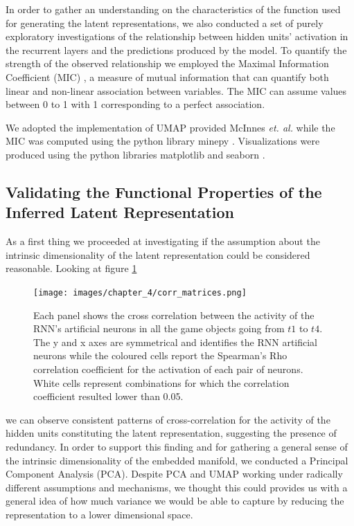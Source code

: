In order to gather an understanding on the characteristics of the function used for generating the latent representations, we also conducted a set of purely exploratory investigations of the relationship between hidden units' activation in the recurrent layers and the predictions produced by the model. To quantify the strength of the observed relationship we employed the Maximal Information Coefficient (MIC) \cite{reshef2011detecting}, a measure of mutual information that can quantify both linear and non-linear association between variables. The MIC can assume values between 0 to 1 with 1 corresponding to a perfect association. 

We adopted the implementation of UMAP provided McInnes \textit{et. al.} \cite{mcinnes2018umap-software} while the MIC was computed using the python library minepy \cite{albanese2013minerva}. Visualizations were produced using the python libraries matplotlib \cite{hunter2007matplotlib} and seaborn \cite{waskom2021seaborn}.

\subsection{Validating the Functional Properties of the Inferred Latent Representation}
\label{functional_properties}
As a first thing we proceeded at investigating if the assumption about the intrinsic dimensionality of the latent representation could be considered reasonable. Looking at figure \ref{cross_corr_act}

\begin{figure}[!htb]
\centering
\texttt{[image: images/chapter\_4/corr\_matrices.png]}
\caption[\textbf{Cross-correlation analysis of the hidden units activation of the RNN architecture}]{Each panel shows the cross correlation between the activity of the RNN's artificial neurons in all the game objects going from $t1$ to $t4$. The y and x axes are symmetrical and identifies the RNN artificial neurons while the coloured cells report the Spearman's Rho correlation coefficient for the activation of each pair of neurons. White cells represent combinations for which the correlation coefficient resulted lower than 0.05.}
\label{cross_corr_act} 
\end{figure}

we can observe consistent patterns of cross-correlation for the activity of the hidden units constituting the latent representation, suggesting the presence of redundancy. In order to support this finding and for gathering a general sense of the intrinsic dimensionality of the embedded manifold, we  conducted a Principal Component Analysis (PCA). Despite PCA and UMAP working under radically different assumptions and mechanisms, we thought this could provides us with a general idea of how much variance we would be able to capture by reducing the representation to a lower dimensional space. 

